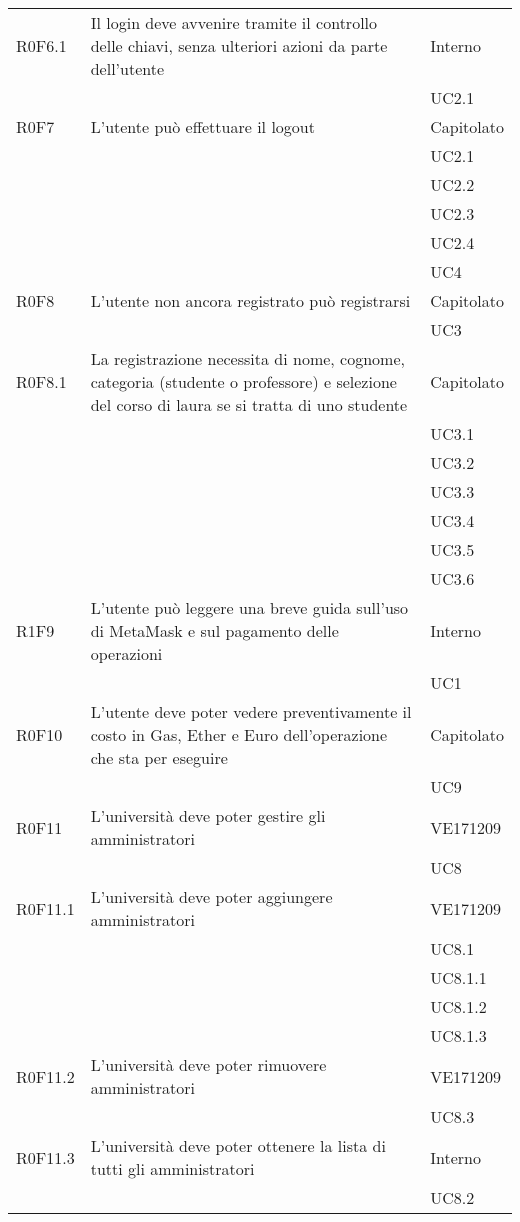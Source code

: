 \documentclass[AnalisiDeiRequisiti.tex]{subfiles}
\begin{document}
\begin{longtable}[H]{|p{2cm}|p{5cm}|p{5cm}|}
	R0F6.1 &  Il login deve avvenire tramite il controllo delle chiavi, senza ulteriori azioni da parte dell'utente & Interno \\ 
	& & UC2.1 \\ \hline
	R0F7 &  L'utente può effettuare il logout & Capitolato \\ 
	& & UC2.1  \\
	& & UC2.2 \\
	& & UC2.3 \\
	& & UC2.4 \\ 
	& & UC4 \\ \hline
	R0F8 &  L'utente non ancora registrato può registrarsi & Capitolato \\ 
	& & UC3 \\ \hline
	R0F8.1 &  La registrazione necessita di nome, cognome, categoria (studente o professore) e selezione del corso di laura se si tratta di uno studente & Capitolato \\
	& & UC3.1 \\
	& & UC3.2 \\
	& & UC3.3 \\
	& & UC3.4 \\
	& & UC3.5 \\
	& & UC3.6 \\ \hline
	R1F9 &  L'utente può leggere una breve guida sull'uso di MetaMask e sul pagamento delle operazioni & Interno \\ 
	& & UC1 \\ \hline
	R0F10 &  L'utente deve poter vedere preventivamente il costo in Gas, Ether e Euro dell'operazione che sta per eseguire & Capitolato \\
	& & UC9 \\ \hline
	R0F11 &  L'università deve poter gestire gli amministratori & VE171209 \\
	& & UC8 \\ \hline
	R0F11.1 &  L'università deve poter aggiungere amministratori & VE171209 \\
	& & UC8.1 \\
	& & UC8.1.1 \\ 
	& & UC8.1.2 \\
	& & UC8.1.3 \\ \hline
	R0F11.2 &  L'università deve poter rimuovere amministratori & VE171209 \\
	& & UC8.3 \\ \hline
	R0F11.3 &  L'università deve poter ottenere la lista di tutti gli amministratori & Interno \\
	& & UC8.2 \\ \hline

\end{longtable}
\end{document}
